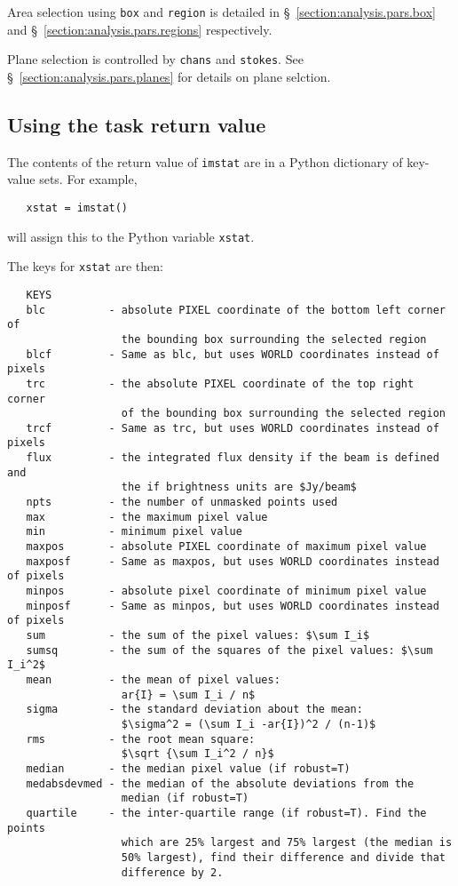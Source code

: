 Area selection using {\tt box} and {\tt region} is detailed in 
\S~\ref{section:analysis.pars.box} and
\S~\ref{section:analysis.pars.regions} respectively.

Plane selection is controlled by {\tt chans} and {\tt stokes}.
See \S~\ref{section:analysis.pars.planes} for details on plane
selction.



\subsection{Using the task return value}
\label{section:analysis.imstat.xstat}

The contents of the return value of {\tt imstat} are in a Python
dictionary of key-value sets.  For example,
\small
\begin{verbatim}
   xstat = imstat()
\end{verbatim}
\normalsize
will assign this to the Python variable {\tt xstat}.

The keys for {\tt xstat} are then:
\small
\begin{verbatim}
   KEYS
   blc          - absolute PIXEL coordinate of the bottom left corner of 
                  the bounding box surrounding the selected region
   blcf         - Same as blc, but uses WORLD coordinates instead of pixels
   trc          - the absolute PIXEL coordinate of the top right corner 
                  of the bounding box surrounding the selected region
   trcf         - Same as trc, but uses WORLD coordinates instead of pixels
   flux         - the integrated flux density if the beam is defined and 
                  the if brightness units are $Jy/beam$
   npts         - the number of unmasked points used
   max          - the maximum pixel value
   min          - minimum pixel value
   maxpos       - absolute PIXEL coordinate of maximum pixel value
   maxposf      - Same as maxpos, but uses WORLD coordinates instead of pixels
   minpos       - absolute pixel coordinate of minimum pixel value
   minposf      - Same as minpos, but uses WORLD coordinates instead of pixels
   sum          - the sum of the pixel values: $\sum I_i$
   sumsq        - the sum of the squares of the pixel values: $\sum I_i^2$
   mean         - the mean of pixel values: 
                  ar{I} = \sum I_i / n$
   sigma        - the standard deviation about the mean: 
                  $\sigma^2 = (\sum I_i -ar{I})^2 / (n-1)$
   rms          - the root mean square: 
                  $\sqrt {\sum I_i^2 / n}$
   median       - the median pixel value (if robust=T)
   medabsdevmed - the median of the absolute deviations from the 
                  median (if robust=T)    
   quartile     - the inter-quartile range (if robust=T). Find the points 
                  which are 25% largest and 75% largest (the median is 
                  50% largest), find their difference and divide that 
                  difference by 2.
\end{verbatim}
\normalsize

